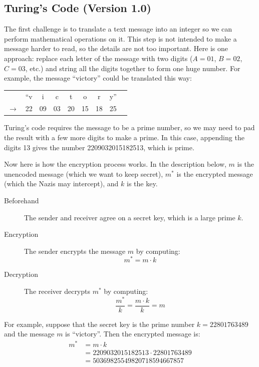 \subsection{Turing's Code (Version 1.0)}

The first challenge is to translate a text message into an integer so
we can perform mathematical operations on it.  This step is not
intended to make a message harder to read, so the details are not too
important.  Here is one approach: replace each letter of the message
with two digits ($A = 01$, $B = 02$, $C = 03$, etc.) and string all
the digits together to form one huge number.  For example, the message
``victory'' could be translated this way:
%
\begin{center}
\begin{tabular}{ccccccccc}
   &``v &  i &  c &  t & o & r & y'' \\
$\rightarrow$ & 22 & 09 & 03 & 20 & 15 & 18 & 25
\end{tabular}
\end{center}
%
Turing's code requires the message to be a prime number, so we may
need to pad the result with a few more digits to make a prime.  In
this case, appending the digits 13 gives the number 2209032015182513,
which is prime.

Now here is how the encryption process works.  In the description
below, $m$ is the unencoded message (which we want to keep secret),
$m^*$ is the encrypted message (which the Nazis may intercept), and
$k$ is the key.

\begin{description}

\item[Beforehand] The sender and receiver agree on a secret key, which
is a large prime $k$.

\item[Encryption] The sender encrypts the message $m$ by computing:
\[
m^* = m \cdot k
\]

\item[Decryption] The receiver decrypts $m^*$ by computing:
\[
\frac{m^*}{k} = \frac{m \cdot k}{k} = m
\]

\end{description}

For example, suppose that the secret key is the prime number $k =
22801763489$ and the message $m$ is ``victory''.  Then the encrypted
message is:
%
\begin{align*}
m^* & = m \cdot k \\
   & = 2209032015182513 \cdot 22801763489 \\
   & = 50369825549820718594667857
\end{align*}

